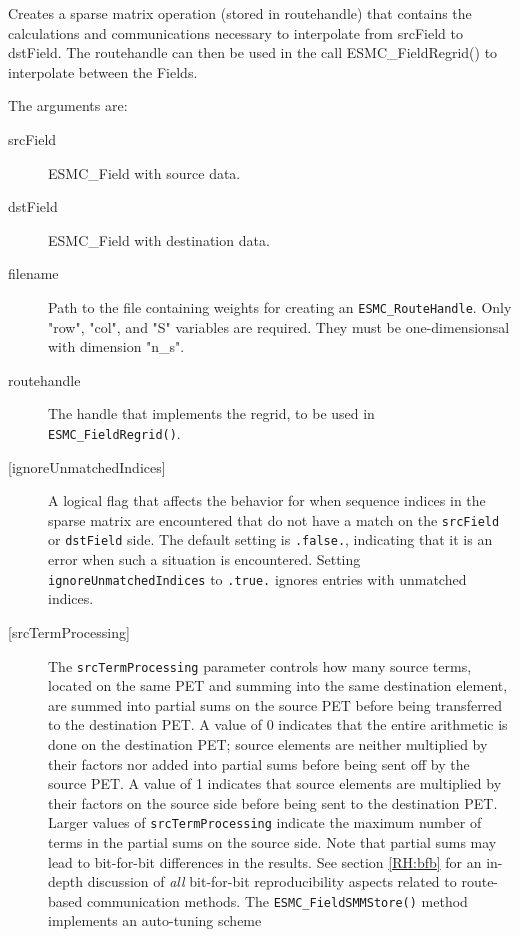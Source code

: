   
     Creates a sparse matrix operation (stored in routehandle) that contains
     the calculations and communications necessary to interpolate from srcField
     to dstField. The routehandle can then be used in the call ESMC\_FieldRegrid()
     to interpolate between the Fields.
  
    The arguments are:
    \begin{description}
    \item[srcField]
      ESMC\_Field with source data.
    \item[dstField]
      ESMC\_Field with destination data.
    \item [filename]
      Path to the file containing weights for creating an {\tt ESMC\_RouteHandle}.
      Only "row", "col", and "S" variables are required. They
      must be one-dimensionsal with dimension "n\_s".
    \item[routehandle]
      The handle that implements the regrid, to be used in {\tt ESMC\_FieldRegrid()}.
    \item [{[ignoreUnmatchedIndices]}]
      A logical flag that affects the behavior for when sequence indices
      in the sparse matrix are encountered that do not have a match on the
      {\tt srcField} or {\tt dstField} side. The default setting is
      {\tt .false.}, indicating that it is an error when such a situation is
      encountered. Setting {\tt ignoreUnmatchedIndices} to {\tt .true.} ignores
      entries with unmatched indices.
    \item [{[srcTermProcessing]}]
      The {\tt srcTermProcessing} parameter controls how many source terms,
      located on the same PET and summing into the same destination element,
      are summed into partial sums on the source PET before being transferred
      to the destination PET. A value of 0 indicates that the entire arithmetic
      is done on the destination PET; source elements are neither multiplied
      by their factors nor added into partial sums before being sent off by the
      source PET. A value of 1 indicates that source elements are multiplied
      by their factors on the source side before being sent to the destination
      PET. Larger values of {\tt srcTermProcessing} indicate the maximum number
      of terms in the partial sums on the source side.
      Note that partial sums may lead to bit-for-bit differences in the results.
      See section \ref{RH:bfb} for an in-depth discussion of {\em all}
      bit-for-bit reproducibility aspects related to route-based communication
      methods.
      The {\tt ESMC\_FieldSMMStore()} method implements an auto-tuning scheme

\end{description}

